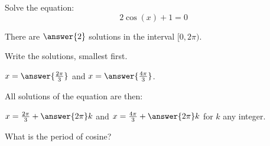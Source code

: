 \documentclass{ximera}
\author{Bobby Ramsey}
\begin{document}
\begin{exercise}

	Solve the equation:
	 \[2\cos(x) + 1 = 0\]
	
	There are $\answer{2}$ solutions in the interval $[0, 2\pi)$.	
	\begin{exercise}
		Write the solutions, smallest first.
		
		$x = \answer{\frac{2\pi}{3}}$ and $x = \answer{\frac{4\pi}{3}}$.
		\begin{exercise}
			All solutions of the equation are then:
			
			$x = \frac{2\pi}{3} + \answer{2\pi} k$ and $x=\frac{4\pi}{3} + \answer{2\pi} k$ for $k$ any integer.
			\begin{hint}
				What is the period of cosine?
			\end{hint}
		\end{exercise}

	\end{exercise}

\end{exercise}
\end{document}
